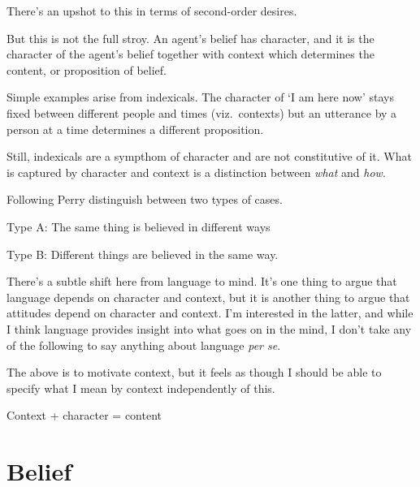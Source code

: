 \documentclass[10pt]{article}
\begin{document}
There's an upshot to this in terms of second-order desires.





But this is not the full stroy.
An agent's belief has character, and it is the character of the agent's belief together with context which determines the content, or proposition of belief.

Simple examples arise from indexicals.
The character of `I am here now' stays fixed between different people and times (viz.\ contexts) but an utterance by a person at a time determines a different proposition.

Still, indexicals are a sympthom of character and are not constitutive of it.
What is captured by character and context is a distinction between \emph{what} and \emph{how}.

Following Perry distinguish between two types of cases.

Type A: The same thing is believed in different ways

Type B: Different things are believed in the same way.

There's a subtle shift here from language to mind.
It's one thing to argue that language depends on character and context, but it is another thing to argue that attitudes depend on character and context.
I'm interested in the latter, and while I think language provides insight into what goes on in the mind, I don't take any of the following to say anything about language \emph{per se}.

The above is to motivate context, but it feels as though I should be able to specify what I mean by context independently of this.



Context + character = content


\section{Belief}
\label{sec:belief}
\end{document}
